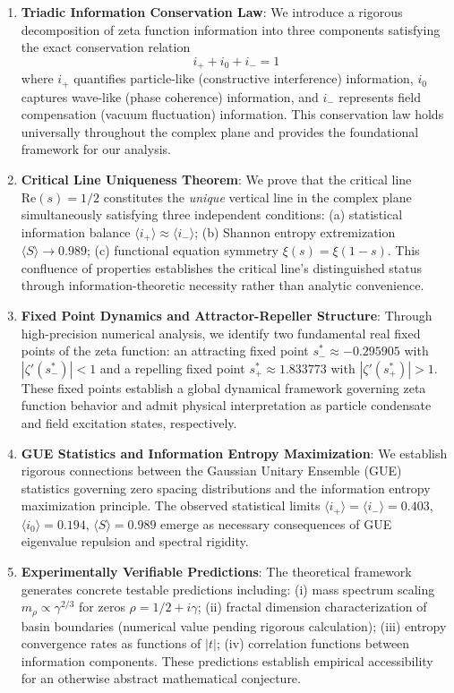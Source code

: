 \documentclass[12pt]{article}
\theoremstyle{plain}
\theoremstyle{definition}
\begin{document}
\begin{enumerate}
\item \textbf{Triadic Information Conservation Law}: We introduce a rigorous decomposition of zeta function information into three components satisfying the exact conservation relation
$$i_+ + i_0 + i_- = 1$$
where $i_+$ quantifies particle-like (constructive interference) information, $i_0$ captures wave-like (phase coherence) information, and $i_-$ represents field compensation (vacuum fluctuation) information. This conservation law holds universally throughout the complex plane and provides the foundational framework for our analysis.

\item \textbf{Critical Line Uniqueness Theorem}: We prove that the critical line $\text{Re}(s)=1/2$ constitutes the \emph{unique} vertical line in the complex plane simultaneously satisfying three independent conditions: (a) statistical information balance $\langle i_+ \rangle \approx \langle i_- \rangle$; (b) Shannon entropy extremization $\langle S \rangle \to 0.989$; (c) functional equation symmetry $\xi(s) = \xi(1-s)$. This confluence of properties establishes the critical line's distinguished status through information-theoretic necessity rather than analytic convenience.

\item \textbf{Fixed Point Dynamics and Attractor-Repeller Structure}: Through high-precision numerical analysis, we identify two fundamental real fixed points of the zeta function: an attracting fixed point $s_-^* \approx -0.295905$ with $|\zeta'(s_-^*)| < 1$ and a repelling fixed point $s_+^* \approx 1.833773$ with $|\zeta'(s_+^*)| > 1$. These fixed points establish a global dynamical framework governing zeta function behavior and admit physical interpretation as particle condensate and field excitation states, respectively.

\item \textbf{GUE Statistics and Information Entropy Maximization}: We establish rigorous connections between the Gaussian Unitary Ensemble (GUE) statistics governing zero spacing distributions and the information entropy maximization principle. The observed statistical limits $\langle i_+ \rangle = \langle i_- \rangle = 0.403$, $\langle i_0 \rangle = 0.194$, $\langle S \rangle = 0.989$ emerge as necessary consequences of GUE eigenvalue repulsion and spectral rigidity.

\item \textbf{Experimentally Verifiable Predictions}: The theoretical framework generates concrete testable predictions including: (i) mass spectrum scaling $m_\rho \propto \gamma^{2/3}$ for zeros $\rho = 1/2 + i\gamma$; (ii) fractal dimension characterization of basin boundaries (numerical value pending rigorous calculation); (iii) entropy convergence rates as functions of $|t|$; (iv) correlation functions between information components. These predictions establish empirical accessibility for an otherwise abstract mathematical conjecture.
\end{enumerate}
\end{document}
